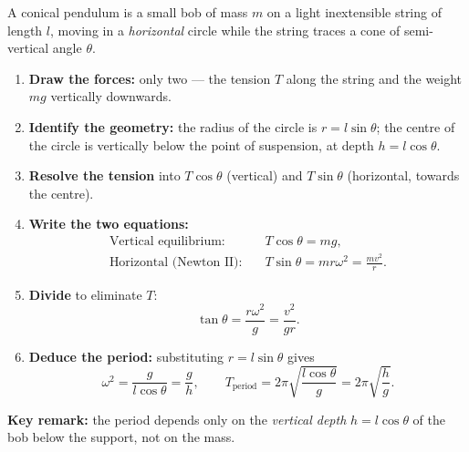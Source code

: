 \documentclass[11pt]{article}
\newcommand{\cle}[1]{{\popxbold\color{popdark}#1}}
\begin{document}
\begin{methode}
A \cle{conical pendulum} is a small bob of mass $m$ on a light inextensible string of length $l$, moving in a \emph{horizontal} circle while the string traces a cone of semi-vertical angle $\theta$.
\begin{enumerate}
\item \textbf{Draw the forces:} only two — the tension $T$ along the string and the weight $mg$ vertically downwards.
\item \textbf{Identify the geometry:} the radius of the circle is $r = l\sin\theta$; the centre of the circle is vertically below the point of suspension, at depth $h = l\cos\theta$.
\item \textbf{Resolve the tension} into $T\cos\theta$ (vertical) and $T\sin\theta$ (horizontal, towards the centre).
\item \textbf{Write the two equations:}
\begin{align*}
\text{Vertical equilibrium:} \quad & T\cos\theta = mg,\\
\text{Horizontal (Newton II):} \quad & T\sin\theta = mr\omega^2 = \frac{mv^2}{r}.
\end{align*}
\item \textbf{Divide} to eliminate $T$:
\[ \tan\theta = \frac{r\omega^2}{g} = \frac{v^2}{gr}. \]
\item \textbf{Deduce the period:} substituting $r = l\sin\theta$ gives
\[ \omega^2 = \frac{g}{l\cos\theta} = \frac{g}{h}, \qquad T_{\text{period}} = 2\pi\sqrt{\frac{l\cos\theta}{g}} = 2\pi\sqrt{\frac{h}{g}}. \]
\end{enumerate}
\textbf{Key remark:} the period depends only on the \emph{vertical depth} $h = l\cos\theta$ of the bob below the support, not on the mass.
\end{methode}
\end{document}
